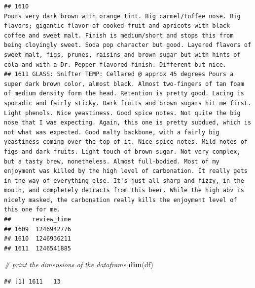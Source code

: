 \documentclass[
  a4paper,
]{article}
\newenvironment{Shaded}{\begin{snugshade}}{\end{snugshade}}
\newcommand{\CommentTok}[1]{\textcolor[rgb]{0.56,0.35,0.01}{\textit{#1}}}
\newcommand{\FunctionTok}[1]{\textcolor[rgb]{0.13,0.29,0.53}{\textbf{#1}}}
\newcommand{\NormalTok}[1]{#1}
\begin{document}
\begin{verbatim}
## 1610                                                                                                                                                                                                                                                                                                                                                                                                                                                                                                                                                                               Pours very dark brown with orange tint. Big carmel/toffee nose. Big flavors; gigantic flavor of cooked fruit and apricots with black coffee and sweet malt. Finish is medium/short and stops this from being cloyingly sweet. Soda pop character but good. Layered flavors of sweet malt, figs, prunes, raisins and brown sugar but with hints of cola and with a Dr. Pepper flavored finish. Different but nice.
## 1611 GLASS: Snifter TEMP: Cellared @ approx 45 degrees Pours a super dark brown color, almost black. Almost two-fingers of tan foam of medium density form the head. Retention is pretty good. Lacing is sporadic and fairly sticky. Dark fruits and brown sugars hit me first. Light phenols. Nice yeastiness. Good spice notes. Not quite the big nose that I was expecting. Again, this one is pretty subdued, which is not what was expected. Good malty backbone, with a fairly big yeastiness coming over the top of it. Nice spice notes. Mild notes of figs and dark fruits. Light touch of brown sugar. Not very complex, but a tasty brew, nonetheless. Almost full-bodied. Most of my enjoyment was killed by the high level of carbonation. It really gets in the way of everything else. It's just all sharp and fizzy, in the mouth, and completely detracts from this beer. While the high abv is nicely masked, the carbonation really kills the enjoyment level of this one for me.
##      review_time
## 1609  1246942776
## 1610  1246936211
## 1611  1246541885
\end{verbatim}

\begin{Shaded}
\begin{Highlighting}[]
\CommentTok{\# print the dimensions of the dataframe}
\FunctionTok{dim}\NormalTok{(df)}
\end{Highlighting}
\end{Shaded}

\begin{verbatim}
## [1] 1611   13
\end{verbatim}
\end{document}
